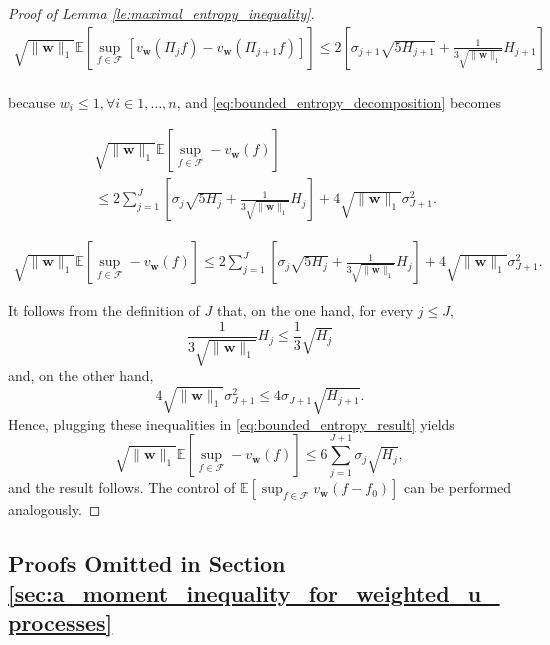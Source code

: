 \documentclass[letterpaper]{article} %
\def\DoubleColumn{}
\def\DoubleColumnEnd{}
\def\SingleColumn{}
\def\SingleColumnEnd{}
\newcommand{\E}{\mathbb{E}}
\newcommand{\weight}{\mathbf{w}}
\newcommand{\normo}[1]{\|#1\|_1}
\begin{document}
\begin{proof}[Proof of Lemma \ref{le:maximal_entropy_inequality}]
\begin{align*}
        \sqrt{\normo{\weight{}}}\E[\sup_{f\in\mathcal{F}}[v_\weight(\Pi_jf)-v_\weight(\Pi_{j+1}f)]]\le 2[\sigma_{j+1}\sqrt{5H_{j+1}}+\frac{1}{3\sqrt{\normo{\weight{}}}}H_{j+1}]\\
    \end{align*}
    \SingleColumnEnd
    because $w_i\le 1, \forall i\in 1,\dots,n$,
    and \eqref{eq:bounded_entropy_decomposition} becomes
    \DoubleColumn
    \begin{equation}
    \begin{aligned}
        \label{eq:bounded_entropy_result}
        &\sqrt{\normo{\weight{}}}\E[\sup_{f\in\mathcal{F}}-v_\weight(f)]\\
        &\le 2\sum_{j=1}^J[\sigma_j\sqrt{5H_j}+\frac{1}{3\sqrt{\normo{\weight{}}}}H_j]+4\sqrt{\normo{\weight{}}}\sigma_{J+1}^2.
    \end{aligned}
    \end{equation}
    \DoubleColumnEnd
    \SingleColumn
    \begin{equation}
    \begin{aligned}
        \label{eq:bounded_entropy_result}
        \sqrt{\normo{\weight{}}}\E[\sup_{f\in\mathcal{F}}-v_\weight(f)]\le 2\sum_{j=1}^J[\sigma_j\sqrt{5H_j}+\frac{1}{3\sqrt{\normo{\weight{}}}}H_j]+4\sqrt{\normo{\weight{}}}\sigma_{J+1}^2.
    \end{aligned}
    \end{equation}
    \SingleColumnEnd
    It follows from the definition of $J$ that, on the one hand, for every $j\le J$,
    \[\frac{1}{3\sqrt{\normo{\weight{}}}}H_j\le \frac{1}{3}\sqrt{H_j}\]
    and, on the other hand,
    \[4\sqrt{\normo{\weight{}}}\sigma_{J+1}^2\le 4\sigma_{J+1}\sqrt{H_{j+1}}.\]
    Hence, plugging these inequalities in \eqref{eq:bounded_entropy_result} yields
    \[\sqrt{\normo{\weight{}}}\E[\sup_{f\in\mathcal{F}}-v_\weight(f)]\le 6\sum_{j=1}^{J+1}\sigma_j\sqrt{H_j},\]
    and the result follows. The control of $\E[\sup_{f\in\mathcal{F}}v_\weight(f-f_0)]$ can be performed analogously.
\end{proof}

\subsection{Proofs Omitted in Section \ref{sec:a_moment_inequality_for_weighted_u_processes}} %
\label{sec:proofs_omitted_in_section_sec:a_moment_inequality_for_weighted_u_processes}
\end{document}
